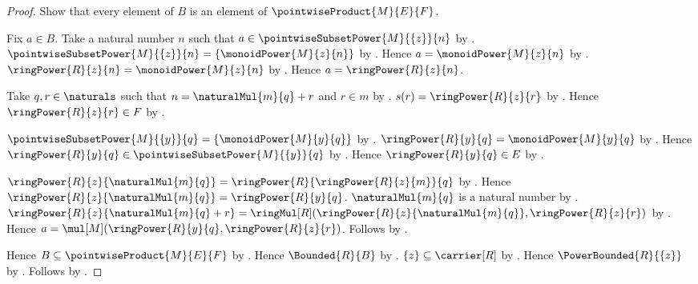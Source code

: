 \begin{proof}
    Show that every element of $B$ is an element of
        $\pointwiseProduct{M}{E}{F}$.
    \begin{subproof}
        Fix $a\in B$.
        Take a natural number $n$ such that
            $a\in\pointwiseSubsetPower{M}{\{z\}}{n}$ by
            .
        $\pointwiseSubsetPower{M}{\{z\}}{n}
            =\{\monoidPower{M}{z}{n}\}$ by
            .
        Hence $a=\monoidPower{M}{z}{n}$ by .
        $\ringPower{R}{z}{n}=\monoidPower{M}{z}{n}$ by
            .
        Hence $a=\ringPower{R}{z}{n}$.

        Take $q,r\in\naturals$ such that
            $n=\naturalMul{m}{q}+r$ and $r\in m$ by
            .
        $s(r)=\ringPower{R}{z}{r}$ by
            .
        Hence $\ringPower{R}{z}{r}\in F$ by
            .

        $\pointwiseSubsetPower{M}{\{y\}}{q}
            =\{\monoidPower{M}{y}{q}\}$ by
            .
        $\ringPower{R}{y}{q}=\monoidPower{M}{y}{q}$ by
            .
        Hence $\ringPower{R}{y}{q}
            \in\pointwiseSubsetPower{M}{\{y\}}{q}$ by
            .
        Hence $\ringPower{R}{y}{q}\in E$ by
            .

        $\ringPower{R}{z}{\naturalMul{m}{q}}
            =\ringPower{R}{\ringPower{R}{z}{m}}{q}$ by
            .
        Hence $\ringPower{R}{z}{\naturalMul{m}{q}}
            =\ringPower{R}{y}{q}$.
        $\naturalMul{m}{q}$ is a natural number by
            .
        $\ringPower{R}{z}{\naturalMul{m}{q}+r}
            =\ringMul[R](
                \ringPower{R}{z}{\naturalMul{m}{q}},
                \ringPower{R}{z}{r})$ by
            .
        Hence $a=\mul[M](
            \ringPower{R}{y}{q},\ringPower{R}{z}{r})$.
        Follows by .
    \end{subproof}
    Hence $B\subseteq\pointwiseProduct{M}{E}{F}$ by .
    Hence $\Bounded{R}{B}$ by .
    $\{z\}\subseteq\carrier[R]$ by .
    Hence $\PowerBounded{R}{\{z\}}$ by .
    Follows by .
\end{proof}
